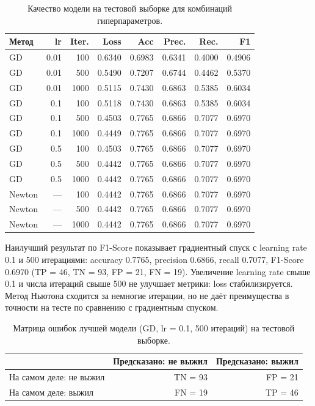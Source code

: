 \documentclass[12pt,a4paper]{article}
\begin{document}
\begin{table}[H]
\centering
\caption{Качество модели на тестовой выборке для комбинаций гиперпараметров.}
\label{tab:lab6_hp}
\small
\begin{tabular}{lrrrrrrr}
\toprule
Метод & lr & Iter. & Loss & Acc & Prec. & Rec. & F1 \\
\midrule
GD & 0.01 & 100 & 0.6340 & 0.6983 & 0.6341 & 0.4000 & 0.4906 \\
GD & 0.01 & 500 & 0.5490 & 0.7207 & 0.6744 & 0.4462 & 0.5370 \\
GD & 0.01 & 1000 & 0.5115 & 0.7430 & 0.6863 & 0.5385 & 0.6034 \\
GD & 0.1 & 100 & 0.5118 & 0.7430 & 0.6863 & 0.5385 & 0.6034 \\
GD & 0.1 & 500 & 0.4503 & 0.7765 & 0.6866 & 0.7077 & 0.6970 \\
GD & 0.1 & 1000 & 0.4449 & 0.7765 & 0.6866 & 0.7077 & 0.6970 \\
GD & 0.5 & 100 & 0.4503 & 0.7765 & 0.6866 & 0.7077 & 0.6970 \\
GD & 0.5 & 500 & 0.4442 & 0.7765 & 0.6866 & 0.7077 & 0.6970 \\
GD & 0.5 & 1000 & 0.4442 & 0.7765 & 0.6866 & 0.7077 & 0.6970 \\
Newton & --- & 100 & 0.4442 & 0.7765 & 0.6866 & 0.7077 & 0.6970 \\
Newton & --- & 500 & 0.4442 & 0.7765 & 0.6866 & 0.7077 & 0.6970 \\
Newton & --- & 1000 & 0.4442 & 0.7765 & 0.6866 & 0.7077 & 0.6970 \\
\bottomrule
\end{tabular}
\end{table}

Наилучший результат по F1-Score показывает градиентный спуск с learning rate 0.1 и 500 итерациями: accuracy 0.7765, precision 0.6866, recall 0.7077, F1-Score 0.6970 (TP = 46, TN = 93, FP = 21, FN = 19). Увеличение learning rate свыше 0.1 и числа итераций свыше 500 не улучшает метрики: loss стабилизируется. Метод Ньютона сходится за немногие итерации, но не даёт преимущества в точности на тесте по сравнению с градиентным спуском.

\begin{table}[H]
\centering
\caption{Матрица ошибок лучшей модели (GD, lr = 0.1, 500 итераций) на тестовой выборке.}
\label{tab:lab6_confusion}
\begin{tabular}{lrr}
\toprule
 & Предсказано: не выжил & Предсказано: выжил \\
\midrule
На самом деле: не выжил & TN = 93 & FP = 21 \\
На самом деле: выжил & FN = 19 & TP = 46 \\
\bottomrule
\end{tabular}
\end{table}
\end{document}
